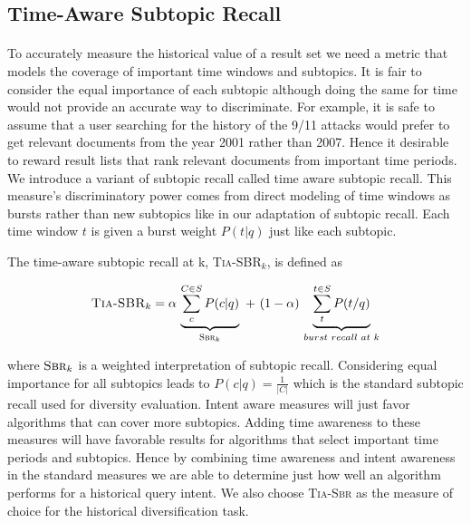 

\subsection{Time-Aware Subtopic Recall}
\label{sec:ta-sbr}
\paragraph{}
To accurately measure the historical value of a result set we need a metric that models the coverage of important time windows and subtopics. It is fair to consider the equal importance of each subtopic although doing the same for time would not provide an accurate way to discriminate. For example, it is safe to assume that a user searching for the history of the 9/11 attacks would prefer to get relevant documents from the year 2001 rather than 2007. Hence it desirable to reward result lists that rank relevant documents from important time periods. We introduce a variant of subtopic recall called time aware subtopic recall. This measure's discriminatory power comes from direct modeling of time windows as bursts rather than new subtopics like in our adaptation of subtopic recall. Each time window $t$ is given a burst weight $P(t|q)$ just like each subtopic. 


\begin{definition}
The time-aware subtopic recall at k, \textsc{Tia-SBR}$_k$, is defined as

\begin{equation}
\label{eq:tasbr}
\textsc{Tia-SBR}_k =  \alpha \, \underbrace{\sum_c^{C \in S} P(c|q)}_{\textsc{Sbr}_k} \,\,+ \,\, (1-\alpha) \, \underbrace{\sum_t^{t \in S} P(t/q)}_{burst \,\,recall \,\,at \,\,k}
\end{equation}
\end{definition}

where $\textsc{Sbr}_k$ is a weighted interpretation of subtopic recall. Considering equal importance for all subtopics leads to $P(c|q) = \frac{1}{|C|}$ which is the standard subtopic recall used for diversity evaluation. Intent aware measures will just favor algorithms that can cover more subtopics. Adding time awareness to these measures will have favorable results for algorithms that select important time periods and subtopics. Hence by combining time awareness and intent awareness in the standard measures we are able to determine just how well an algorithm performs for a historical query intent. We also choose \textsc{Tia-Sbr} as the measure of choice for the historical diversification task. 

